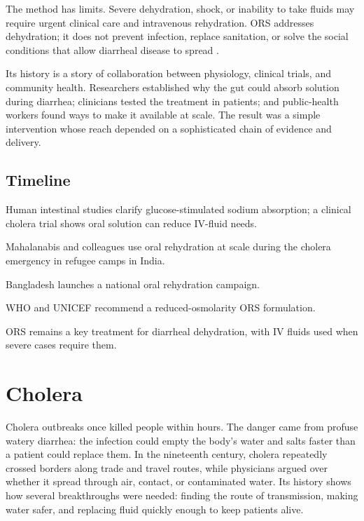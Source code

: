 \documentclass[12pt,oneside]{book}
\begin{document}
The method has limits. Severe dehydration, shock, or inability to take
fluids may require urgent clinical care and intravenous rehydration. ORS
addresses dehydration; it does not prevent infection, replace sanitation,
or solve the social conditions that allow diarrheal disease to spread
\cite{whoDiarrhoea}.

Its history is a story of collaboration between physiology, clinical trials,
and community health. Researchers established why the gut could absorb
solution during diarrhea; clinicians tested the treatment in patients; and
public-health workers found ways to make it available at scale. The result
was a simple intervention whose reach depended on a sophisticated chain of
evidence and delivery.

\section*{Timeline}
\begin{description}[leftmargin=2.3cm,style=nextline]
  \item[1968] Human intestinal studies clarify glucose-stimulated sodium absorption; a clinical cholera trial shows oral solution can reduce IV-fluid needs.
  \item[1971] Mahalanabis and colleagues use oral rehydration at scale during the cholera emergency in refugee camps in India.
  \item[1979] Bangladesh launches a national oral rehydration campaign.
  \item[2003--2005] WHO and UNICEF recommend a reduced-osmolarity ORS formulation.
  \item[Today] ORS remains a key treatment for diarrheal dehydration, with IV fluids used when severe cases require them.
\end{description}
\chapter[Cholera]{Cholera}

Cholera outbreaks once killed people within hours. The danger came from
profuse watery diarrhea: the infection could empty the body's water and salts
faster than a patient could replace them. In the nineteenth century, cholera
repeatedly crossed borders along trade and travel routes, while physicians
argued over whether it spread through air, contact, or contaminated water.
Its history shows how several breakthroughs were needed: finding the route of
transmission, making water safer, and replacing fluid quickly enough to keep
patients alive.
\end{document}
